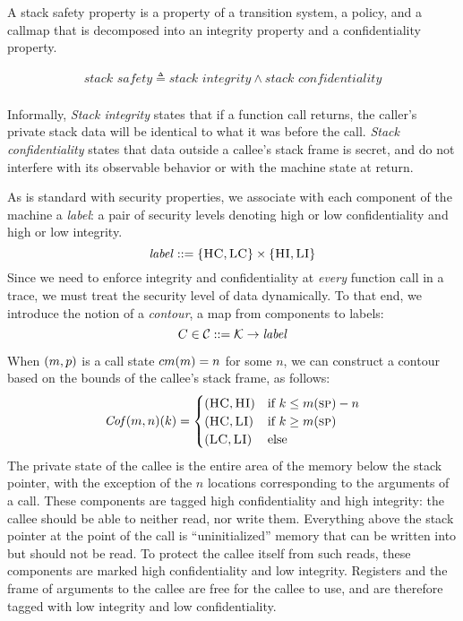 \documentclass[acmsmall,review,anonymous]{acmart}\settopmatter{printfolios=true,printccs=false,printacmref=false}
\begin{document}
A stack safety property is a property of a transition system, a
policy, and a callmap that is decomposed into an integrity property and a
confidentiality property.

    \[\begin{split}
      \textit{stack safety} \triangleq \textit{stack integrity} \land \textit{stack confidentiality} \\
    \end{split}\]

 Informally, {\it Stack
  integrity} states that if a function call returns, the caller's
private stack data will be identical to what it was before the
call. {\it Stack confidentiality} states that data outside a callee's
stack frame is secret, and do not interfere with its observable
behavior or with the machine state at return.

As is standard with security properties, we associate with each
component of the machine a {\em label}: a pair of security levels
denoting high or low confidentiality and high or low integrity.
%
\[\mathit{label} ::= \{\textsc{HC},\textsc{LC}\} \times \{\textsc{HI},\textsc{LI}\}\]
%
Since we need to enforce integrity and confidentiality at {\em every}
function call in a trace, we must treat the security level of data
dynamically. To that end, we introduce the notion of a {\em contour},
a map from components to labels:
%
\[C \in {\mathcal C} ::= {\mathcal K} \rightarrow \mathit{label}\]

When \((m,p)\) is a call state \(cm(m) = n\)
for some \(n\), we can construct a contour based on the bounds of the
callee's stack frame, as follows:
\[\mathit{Cof}(m,n)(k) =
\begin{cases}
  (\textsc{HC},\textsc{HI}) & \text{if } k \leq m(\textsc{sp}) - n \\
  (\textsc{HC},\textsc{LI}) & \text{if } k \geq m(\textsc{sp}) \\
  (\textsc{LC},\textsc{LI}) & \text{else} \\
\end{cases}\]
%
The private state of the callee is the entire area of the memory below
the stack pointer, with the exception of the $n$ locations
corresponding to the arguments of a call. These components are tagged
high confidentiality and high integrity: the callee should be able to
neither read, nor write them.
%
Everything above the stack pointer at the point of the call is
``uninitialized'' memory that can be written into but should not be
read. To protect the callee itself from such reads, these components
are marked high confidentiality and low integrity.
%
Registers and the frame of arguments to the callee are free for the
callee to use, and are therefore tagged with low integrity and low
confidentiality. 
\end{document}
